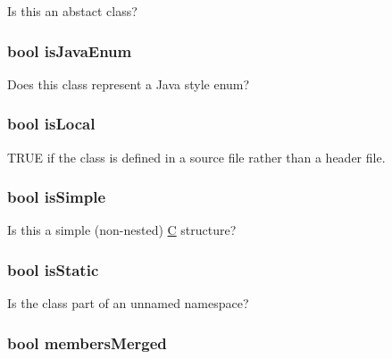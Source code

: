 Is this an abstact class? \hypertarget{class_class_def_impl_a4b9507fb8aad93504c5ef971dc9d25c3}{
\subsubsection[{is\-Java\-Enum}]{\setlength{\rightskip}{0pt plus 5cm}bool is\-Java\-Enum}}\label{class_class_def_impl_a4b9507fb8aad93504c5ef971dc9d25c3}
Does this class represent a Java style enum? \hypertarget{class_class_def_impl_ac605c13c815eff8fc80f638813621e24}{
\subsubsection[{is\-Local}]{\setlength{\rightskip}{0pt plus 5cm}bool is\-Local}}\label{class_class_def_impl_ac605c13c815eff8fc80f638813621e24}
T\-R\-U\-E if the class is defined in a source file rather than a header file. \hypertarget{class_class_def_impl_af8faf5b670c25ccc13f661f3ab94d1e0}{
\subsubsection[{is\-Simple}]{\setlength{\rightskip}{0pt plus 5cm}bool is\-Simple}}\label{class_class_def_impl_af8faf5b670c25ccc13f661f3ab94d1e0}
Is this a simple (non-\/nested) \hyperlink{class_c}{C} structure? \hypertarget{class_class_def_impl_a3e1d0cb67aacaa6d9c38b825147bfe5a}{
\subsubsection[{is\-Static}]{\setlength{\rightskip}{0pt plus 5cm}bool is\-Static}}\label{class_class_def_impl_a3e1d0cb67aacaa6d9c38b825147bfe5a}
Is the class part of an unnamed namespace? \hypertarget{class_class_def_impl_a6501a34b597a75c28ebf096b99359b32}{
\subsubsection[{members\-Merged}]{\setlength{\rightskip}{0pt plus 5cm}bool members\-Merged}}\label{class_class_def_impl_a6501a34b597a75c28ebf096b99359b32}

